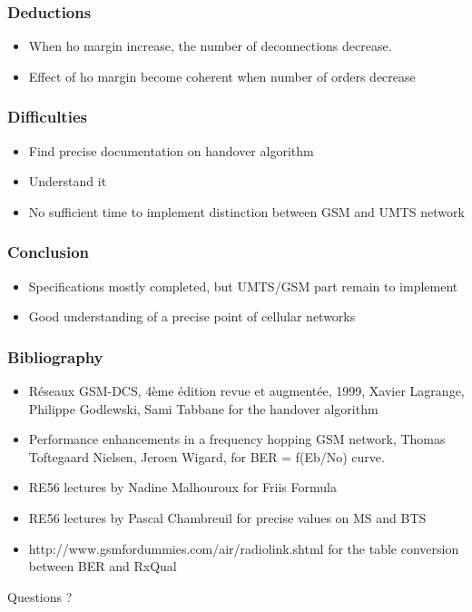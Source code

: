\documentclass{beamer}
\begin{document}
\begin{frame}
\frametitle{Deductions}

\begin{itemize}
  \item When ho margin increase, the number of deconnections decrease.
  \item Effect of ho margin become coherent when number of orders decrease
\end{itemize}
\end{frame}

\begin{frame}
\frametitle{Difficulties}

\begin{itemize}
  \item Find precise documentation on handover algorithm
  \item Understand it
  \item No sufficient time to implement distinction between GSM and UMTS network
\end{itemize}
\end{frame}

\begin{frame}
\frametitle{Conclusion}

\begin{itemize}
  \item Specifications mostly completed, but UMTS/GSM part remain to
implement
  \item Good understanding of a precise point of cellular networks
\end{itemize}
\end{frame}

\begin{frame}
\frametitle{Bibliography}

\begin{itemize}
  \item Réseaux GSM-DCS, 4ème édition revue et augmentée, 1999, Xavier Lagrange,
Philippe Godlewski, Sami Tabbane for the handover algorithm
  \item Performance enhancements in a frequency hopping GSM network, Thomas Toftegaard Nielsen, Jeroen Wigard, for BER = f(Eb/No) curve.
  \item RE56 lectures by Nadine Malhouroux for Friis Formula
  \item RE56 lectures by Pascal Chambreuil for precise values on MS and BTS
  \item http://www.gsmfordummies.com/air/radiolink.shtml for the table conversion between BER and RxQual
\end{itemize}
\end{frame}

\begin{frame}
\begin{center}
Questions ?
\end{center}
\end{frame}
\end{document}
